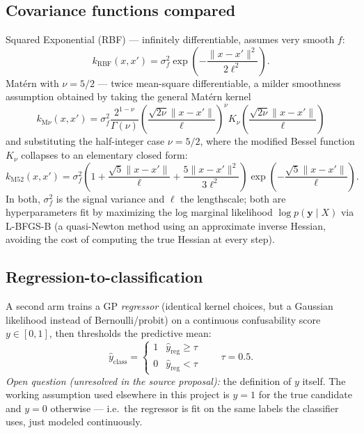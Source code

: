 \documentclass[11pt]{article}
\begin{document}
\subsection{Covariance functions compared}
Squared Exponential (RBF) --- infinitely differentiable, assumes very
smooth $f$:
\begin{equation}
k_{\text{RBF}}(x,x') = \sigma_f^2 \exp\left(-\frac{\|x-x'\|^2}{2\ell^2}\right).
\end{equation}
Mat\'ern with $\nu = 5/2$ --- twice mean-square differentiable, a milder
smoothness assumption obtained by taking the general Mat\'ern kernel
\begin{equation}
k_{\text{M}\nu}(x,x') = \sigma_f^2 \frac{2^{1-\nu}}{\Gamma(\nu)}
\left(\frac{\sqrt{2\nu}\|x-x'\|}{\ell}\right)^{\nu}
K_\nu\!\left(\frac{\sqrt{2\nu}\|x-x'\|}{\ell}\right)
\end{equation}
and substituting the half-integer case $\nu=5/2$, where the modified
Bessel function $K_\nu$ collapses to an elementary closed form:
\begin{equation}
k_{\text{M52}}(x,x') = \sigma_f^2\left(1+\frac{\sqrt{5}\|x-x'\|}{\ell}+\frac{5\|x-x'\|^2}{3\ell^2}\right)\exp\left(-\frac{\sqrt{5}\|x-x'\|}{\ell}\right).
\end{equation}
In both, $\sigma_f^2$ is the signal variance and $\ell$ the lengthscale;
both are hyperparameters fit by maximizing the log marginal likelihood
$\log p(\mathbf{y} \mid X)$ via L-BFGS-B (a quasi-Newton method using an
approximate inverse Hessian, avoiding the cost of computing the true
Hessian at every step).

\subsection{Regression-to-classification}
A second arm trains a GP \emph{regressor} (identical kernel choices, but
a Gaussian likelihood instead of Bernoulli/probit) on a continuous
confusability score $y \in [0,1]$, then thresholds the predictive mean:
\begin{equation}
\hat{y}_{\text{class}} =
\begin{cases}
1 & \hat{y}_{\text{reg}} \geq \tau \\
0 & \hat{y}_{\text{reg}} < \tau
\end{cases}
\qquad \tau = 0.5.
\label{eq:threshold}
\end{equation}
\emph{Open question (unresolved in the source proposal):} the definition
of $y$ itself. The working assumption used elsewhere in this project is
$y=1$ for the true candidate and $y=0$ otherwise --- i.e.\ the regressor
is fit on the same labels the classifier uses, just modeled continuously.
\end{document}
